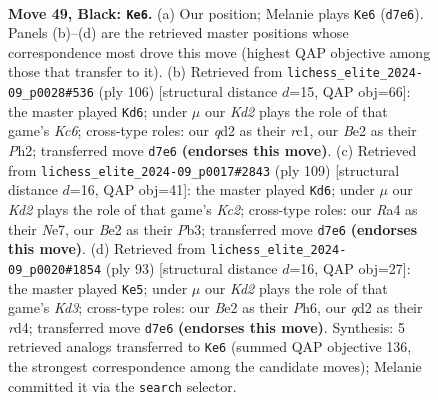 \documentclass[11pt]{article}
\begin{document}
\clearpage

\begin{figure}[p]\centering
\begin{subfigure}{0.46\textwidth}\centering
\resizebox{\linewidth}{!}{%
\newchessgame
\chessboard[
  setfen={8/1p1k4/8/8/r3P3/8/3Qb1PP/1K6 b - - 1 49},
  showmover=false,
  pgfstyle=straightmove, color=movearrow, markmove={d7-e6}
]}
\caption{}
\end{subfigure}\hfill
\begin{subfigure}{0.46\textwidth}\centering
\resizebox{\linewidth}{!}{%
\newchessgame
\chessboard[
  setfen={4k3/7R/P1K4p/4p3/8/8/7P/2r5 w - - 4 54},
  showmover=false,
  pgfstyle=straightmove, color=movearrow, markmove={c6-d6}
]}
\caption{}
\end{subfigure}
\\[4pt]
\begin{subfigure}{0.46\textwidth}\centering
\resizebox{\linewidth}{!}{%
\newchessgame
\chessboard[
  setfen={8/2k1n3/8/P7/2Q5/1p6/1P5K/8 b - - 0 55},
  showmover=false,
  pgfstyle=straightmove, color=movearrow, markmove={c7-d6}
]}
\caption{}
\end{subfigure}\hfill
\begin{subfigure}{0.46\textwidth}\centering
\resizebox{\linewidth}{!}{%
\newchessgame
\chessboard[
  setfen={8/8/3k3p/8/3R4/P5P1/r7/4K3 b - - 6 47},
  showmover=false,
  pgfstyle=straightmove, color=movearrow, markmove={d6-e5}
]}
\caption{}
\end{subfigure}
\caption{\textbf{Move 49, Black: \texttt{Ke6}.} (a) Our position; Melanie plays \texttt{Ke6} (\texttt{d7e6}). Panels (b)--(d) are the retrieved master positions whose correspondence most drove this move (highest QAP objective among those that transfer to it). (b) Retrieved from \texttt{lichess\_elite\_2024-09\_p0028\#536} (ply 106) [structural distance $d$=15, QAP obj=66]: the master played \texttt{Kd6}; under $\mu$ our \emph{Kd2} plays the role of that game's \emph{Kc6}; cross-type roles: our \emph{q}d2 as their \emph{r}c1, our \emph{B}e2 as their \emph{P}h2; transferred move \texttt{d7e6} \textbf{(endorses this move)}. (c) Retrieved from \texttt{lichess\_elite\_2024-09\_p0017\#2843} (ply 109) [structural distance $d$=16, QAP obj=41]: the master played \texttt{Kd6}; under $\mu$ our \emph{Kd2} plays the role of that game's \emph{Kc2}; cross-type roles: our \emph{R}a4 as their \emph{N}e7, our \emph{B}e2 as their \emph{P}b3; transferred move \texttt{d7e6} \textbf{(endorses this move)}. (d) Retrieved from \texttt{lichess\_elite\_2024-09\_p0020\#1854} (ply 93) [structural distance $d$=16, QAP obj=27]: the master played \texttt{Ke5}; under $\mu$ our \emph{Kd2} plays the role of that game's \emph{Kd3}; cross-type roles: our \emph{B}e2 as their \emph{P}h6, our \emph{q}d2 as their \emph{r}d4; transferred move \texttt{d7e6} \textbf{(endorses this move)}. Synthesis: 5 retrieved analogs transferred to \texttt{Ke6} (summed QAP objective 136, the strongest correspondence among the candidate moves); Melanie committed it via the \texttt{search} selector.}
\label{fig:thought-m97}
\end{figure}
\end{document}
